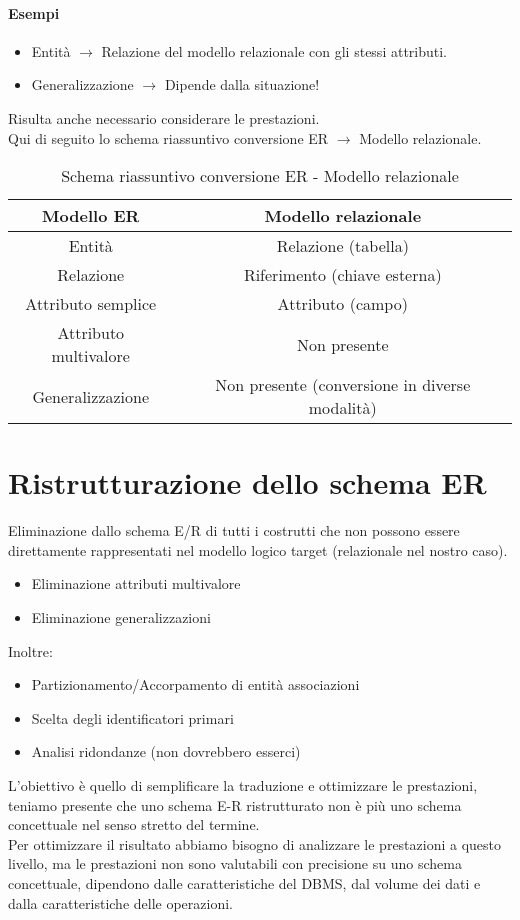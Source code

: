 \paragraph*{Esempi} 
\begin{itemize}
    \item Entità $\rightarrow$ Relazione del modello relazionale con gli 
    stessi attributi.
    \item Generalizzazione $\rightarrow$ Dipende dalla situazione!
\end{itemize}
Risulta anche necessario considerare le prestazioni.\\
Qui di seguito lo schema riassuntivo conversione ER $\rightarrow$ Modello relazionale.\\
\begin{table}[h]
    \centering
    \vspace{10pt}
    \caption*{Schema riassuntivo conversione ER - Modello relazionale}
    \begin{tabular}{|c|c|}
        \hline
        \textbf{Modello ER} & \textbf{Modello relazionale}\\
        \hline
        Entità & Relazione (tabella)\\
        \hline
        Relazione & Riferimento (chiave esterna)\\
        \hline  
        Attributo semplice & Attributo (campo)\\
        \hline
        Attributo multivalore & Non presente\\
        \hline
        Generalizzazione & Non presente (conversione in diverse modalità)\\
        \hline
    \end{tabular}
\end{table}
\section{Ristrutturazione dello schema ER}
Eliminazione dallo schema E/R di tutti i costrutti che non possono
essere direttamente rappresentati nel modello logico target (relazionale nel
nostro caso).
\begin{itemize}
    \item Eliminazione attributi multivalore
    \item Eliminazione generalizzazioni
\end{itemize}
Inoltre:
\begin{itemize}
    \item Partizionamento/Accorpamento di entità associazioni
    \item Scelta degli identificatori primari
    \item Analisi ridondanze (non dovrebbero esserci)
\end{itemize}
L'obiettivo è quello di semplificare la traduzione e ottimizzare le prestazioni,
teniamo presente che uno schema E-R ristrutturato non è più uno schema concettuale nel senso stretto
del termine.\\
Per ottimizzare il risultato abbiamo bisogno di analizzare le prestazioni a questo livello, ma
le prestazioni non sono valutabili con precisione su uno schema concettuale, dipendono dalle
caratteristiche del DBMS, dal volume dei dati e dalla caratteristiche delle operazioni.\\
